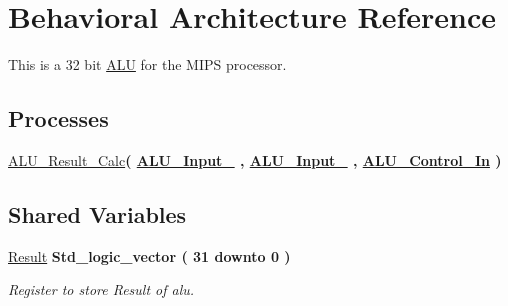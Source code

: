 \hypertarget{class_a_l_u_1_1_behavioral}{\section{Behavioral Architecture Reference}
\label{class_a_l_u_1_1_behavioral}
}


This is a 32 bit \hyperlink{class_a_l_u}{A\-L\-U} for the M\-I\-P\-S processor.  


\subsection*{Processes}
 \begin{DoxyCompactItemize}
\item 
\hyperlink{class_a_l_u_1_1_behavioral_a5cb9b9e6524f025f9ee81455f7323d1c}{A\-L\-U\-\_\-\-Result\-\_\-\-Calc}{\bfseries  ( {\bfseries {\bfseries \hyperlink{class_a_l_u_a914f203651b8887062dd7432ef37b92a}{A\-L\-U\-\_\-\-Input\-\_}} \textcolor{vhdlchar}{ }\textcolor{vhdlchar}{ }\textcolor{vhdlchar}{ }} , {\bfseries {\bfseries \hyperlink{class_a_l_u_aa3b3b0b101b8269e00ade1a474bb35e0}{A\-L\-U\-\_\-\-Input\-\_}} \textcolor{vhdlchar}{ }\textcolor{vhdlchar}{ }} , {\bfseries {\bfseries \hyperlink{class_a_l_u_a9ea12157ac75337610ea73ec756eca4c}{A\-L\-U\-\_\-\-Control\-\_\-\-In}} \textcolor{vhdlchar}{ }} )}
\end{DoxyCompactItemize}
\subsection*{Shared Variables}
 \begin{DoxyCompactItemize}
\item 
\hyperlink{class_a_l_u_1_1_behavioral_a97c0e91da4079e1bcdc77132d69c46b2}{Result} {\bfseries \textcolor{comment}{Std\-\_\-logic\-\_\-vector}\textcolor{vhdlchar}{ }\textcolor{vhdlchar}{(}\textcolor{vhdlchar}{ }\textcolor{vhdlchar}{ } \textcolor{vhdldigit}{31} \textcolor{vhdlchar}{ }\textcolor{vhdlchar}{ }\textcolor{vhdlchar}{ }\textcolor{vhdlkeyword}{downto}\textcolor{vhdlchar}{ }\textcolor{vhdlchar}{ }\textcolor{vhdlchar}{ } \textcolor{vhdldigit}{0} \textcolor{vhdlchar}{ }\textcolor{vhdlchar}{)}\textcolor{vhdlchar}{ }} 
\begin{DoxyCompactList}\small\item\em Register to store Result of alu. \end{DoxyCompactList}\end{DoxyCompactItemize}


